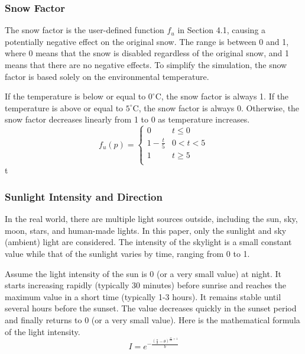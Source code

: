 \documentclass{article}
\begin{document}
\subsubsection {Snow Factor}
The snow factor is the user-defined function \( f_{u} \) in Section 4.1, causing a potentially negative effect on the original snow. 
The range is between 0 and 1, where 0 means that the snow is disabled regardless of the original snow, and 1 means that there are no 
negative effects. To simplify the simulation, the snow factor is based solely on the environmental temperature. 

If the temperature is below or equal to \(0^\circ\mathrm{C}\), the snow factor is always 1. If the temperature is above or equal to 
\(5^\circ\mathrm{C}\), the snow factor is always 0. Otherwise, the snow factor decreases linearly from 1 to 0 as temperature increases.
\[
  f_{u}(p)=
  \left\{
    \begin{array}{ll}
      0 & t\leq 0 \\
      1 - \frac{t}{5} &  0 < t < 5 \\
      1 & t\geq 5 \\
    \end{array} 
  \right. 
\]
 t 

\subsubsection {Sunlight Intensity and Direction}
In the real world, there are multiple light sources outside, including the sun, sky, moon, stars, and human-made lights. In this paper, 
only the sunlight and sky (ambient) light are considered. The intensity of the skylight is a small constant value while that of the 
sunlight varies by time, ranging from 0 to 1.

Assume the light intensity of the sun is 0 (or a very small value) at night. It starts increasing rapidly (typically 30 minutes) 
before sunrise and reaches the maximum value in a short time (typically 1-3 hours). It remains stable until several hours before the 
sunset. The value decreases quickly in the sunset period and finally returns to 0 (or a very small value). Here is the mathematical 
formula of the light intensity.
\[
  I = e^{-\frac{\left(\frac{\pi}{2} - \theta\right)^{\frac{m}{60} + 1}}{b}}
\]
\end{document}
